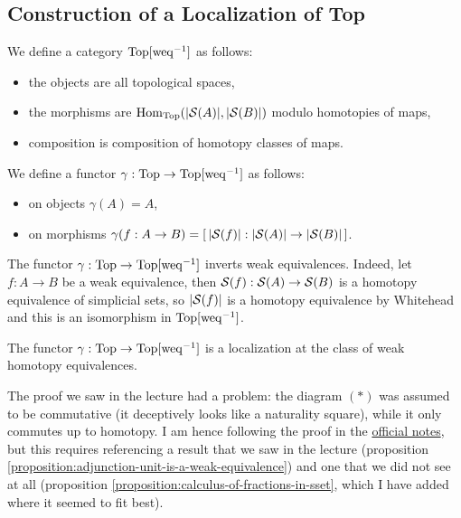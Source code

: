 \subsection{Construction of a Localization of Top}

We define a category $\Top[\weq^\inv]$ as follows:
\begin{itemize}
    \item the objects are all topological spaces,
    \item the morphisms are $\Hom_\Top(|\S(A)|,|\S(B)|)$ modulo homotopies of maps,
    \item composition is composition of homotopy classes of maps.
\end{itemize}

We define a functor $\gamma:\Top\to\Top[\weq^\inv]$ as follows:
\begin{itemize}[label={-}]
    \item on objects $\gamma(A)=A$,
    \item on morphisms $\gamma(f:A\to B)=[\,|\S(f)|:|\S(A)|\to|\S(B)|\,]$.
\end{itemize}

The functor $\gamma:\Top\to\Top[\weq^\inv]$ inverts weak equivalences. Indeed, let $f:A\to B$ be a weak equivalence, then $\S(f):\S(A)\to\S(B)$ is a homotopy equivalence of simplicial sets, so $|\S(f)|$ is a homotopy equivalence by Whitehead and this is an isomorphism in $\Top[\weq^\inv]$.

\begin{theorem}\label{theorem:localization-of-top}
The functor $\gamma:\Top\to\Top[\weq^\inv]$ is a localization at the class of weak homotopy equivalences.
\end{theorem}

\begin{warning}
The proof we saw in the lecture had a problem: the diagram $(*)$ was assumed to be commutative (it deceptively looks like a naturality square), while it only commutes up to homotopy. I am hence following the proof in the \href{https://www.math.uni-bonn.de/people/schwede/sset_vs_spaces.pdf}{official notes}, but this requires referencing a result that we saw in the  lecture (proposition \ref{proposition:adjunction-unit-is-a-weak-equivalence}) and one that we did not see at all (proposition \ref{proposition:calculus-of-fractions-in-sset}, which I have added where it seemed to fit best).
\end{warning}

